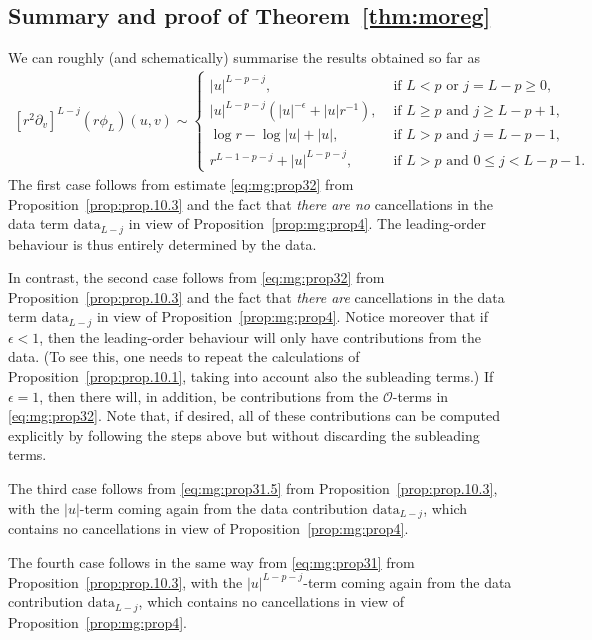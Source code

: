 \documentclass[11pt,english]{article}
\numberwithin{equation}{section}
\theoremstyle{remark}
\theoremstyle{plain}
\theoremstyle{remark}
\newcommand{\pv}{\partial_v}
\renewcommand{\(}{\left(}
\renewcommand{\)}{\right)}
\begin{document}
\subsection{Summary and proof of Theorem~\ref{thm:moreg}}\label{sec:mg:summary}
We can roughly (and schematically) summarise the results obtained so far as
\begin{align}\label{cases}
[r^2\pv]^{L-j}(r\phi_L)(u,v)\sim
	\begin{cases}
			|u|^{L-p-j},& \text{ if } L<p \text{ or } j=L-p\geq 0,\\
			|u|^{L-p-j}(|u|^{-\epsilon}+|u|r^{-1})	,& \text{ if } L\geq p \text{ and } j\geq L-p+1,\\
			\log r-\log|u| +|u|,		& \text{ if } L> p \text{ and } j=L-p-1,\\
			r^{L-1-p-j}+|u|^{L-p-j},		& \text{ if } L> p \text{ and } 0\leq j<L-p-1.
	\end{cases}
\end{align}
The first case follows from estimate \eqref{eq:mg:prop32} from Proposition~\ref{prop:prop.10.3} and the fact that \textit{there are no} cancellations in the data term $\mathrm{data}_{L-j}$ in view of Proposition~\ref{prop:mg:prop4}. The leading-order behaviour is thus entirely determined by the data.

In contrast, the second case follows from \eqref{eq:mg:prop32} from Proposition~\ref{prop:prop.10.3} and the fact that \textit{there are} cancellations in the data term $\mathrm{data}_{L-j}$ in view of Proposition~\ref{prop:mg:prop4}. 
Notice moreover that if $\epsilon<1$, then the leading-order behaviour will only have contributions from the data. (To see this, one needs to repeat the calculations of Proposition~\ref{prop:prop.10.1}, taking into account also the subleading terms.) 
 If $\epsilon=1$, then there will, in addition, be contributions from the $\mathcal O$-terms in \eqref{eq:mg:prop32}. Note that, if desired, all of these contributions can be computed explicitly by following the steps above but without discarding the subleading terms.

The third case follows from \eqref{eq:mg:prop31.5} from Proposition~\ref{prop:prop.10.3}, with the $|u|$-term coming again from the data contribution $\mathrm{data}_{L-j}$, which contains no cancellations in view of Proposition~\ref{prop:mg:prop4}.

The fourth case follows in the same way from \eqref{eq:mg:prop31} from Proposition~\ref{prop:prop.10.3}, with the $|u|^{L-p-j}$-term coming again from the data contribution $\mathrm{data}_{L-j}$, which contains no cancellations in view of Proposition~\ref{prop:mg:prop4}.
\end{document}
